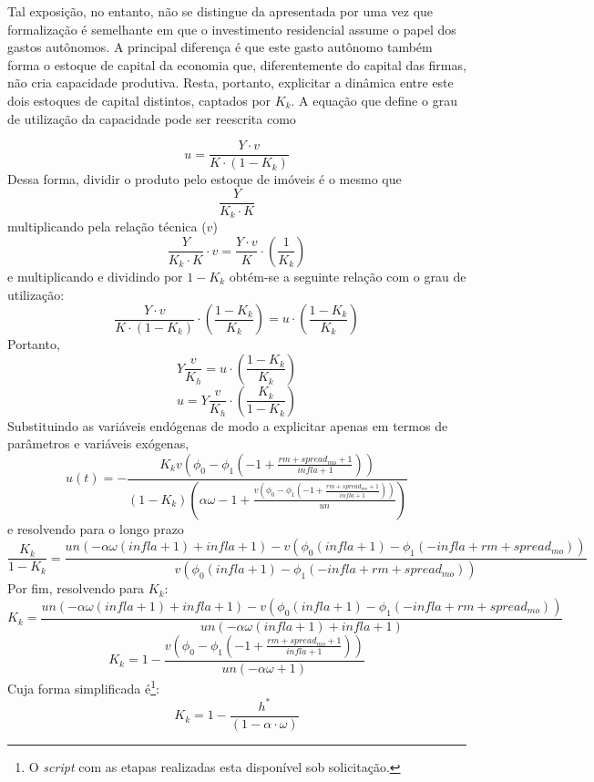 
Tal exposição, no entanto, não se distingue da apresentada por \textcite{freitas_growth_2015} uma vez que formalização é semelhante em que o investimento residencial assume o papel dos gastos autônomos. A principal diferença é que este gasto autônomo também forma o estoque de capital da economia que, diferentemente do capital das firmas, não cria capacidade produtiva. Resta, portanto, explicitar a dinâmica entre este dois estoques de capital distintos, captados por $K_k$. A equação que define o grau de utilização da capacidade pode ser reescrita como

$$
u = \frac{Y\cdot v}{K \cdot (1-K_k)}
$$
Dessa forma, dividir o produto pelo estoque de imóveis é o mesmo que
$$
\frac{Y}{K_k\cdot K}
$$
multiplicando pela relação técnica ($v$)
$$
\frac{Y}{K_k\cdot K}\cdot v = \frac{Y\cdot v}{K}\cdot \left(\frac{1}{K_k}\right)
$$
e multiplicando e dividindo por $1-K_k$ obtém-se a seguinte relação com o grau de utilização:
$$
\frac{Y\cdot v}{K\cdot (1-K_k)}\cdot \left(\frac{1-K_k}{K_k}\right) = u \cdot \left(\frac{1-K_k}{K_k}\right)
$$
Portanto,
$$
Y\frac{v}{K_h} =  u \cdot \left(\frac{1-K_k}{K_k}\right)
$$
$$
u = Y\frac{v}{K_h} \cdot \left(\frac{K_k}{1-K_k}\right)
$$
Substituindo as variáveis endógenas de modo a explicitar apenas em termos de parâmetros e variáveis exógenas,
$$
u{\left(t \right)} = - \frac{K_{k} v \left(\phi_{0} - \phi_{1} \left(-1 + \frac{rm + spread_{mo} + 1}{infla + 1}\right)\right)}{\left(1 - K_{k}\right) \left(\alpha \omega - 1 + \frac{v \left(\phi_{0} - \phi_{1} \left(-1 + \frac{rm + spread_{mo} + 1}{infla + 1}\right)\right)}{un}\right)}
$$
e resolvendo para o longo prazo
$$
\frac{K_{k}}{1 - K_{k}} = \frac{un \left(- \alpha \omega \left(infla + 1\right) + infla + 1\right) - v \left(\phi_{0} \left(infla + 1\right) - \phi_{1} \left(- infla + rm + spread_{mo}\right)\right)}{v \left(\phi_{0} \left(infla + 1\right) - \phi_{1} \left(- infla + rm + spread_{mo}\right)\right)}
$$
Por fim, resolvendo para $K_k$:
$$
K_{k} = \frac{un \left(- \alpha \omega \left(infla + 1\right) + infla + 1\right) - v \left(\phi_{0} \left(infla + 1\right) - \phi_{1} \left(- infla + rm + spread_{mo}\right)\right)}{un \left(- \alpha \omega \left(infla + 1\right) + infla + 1\right)}
$$
\begin{equation}
\label{kAnali}
K_{k} = 1 - \frac{v \left(\phi_{0} - \phi_{1} \left(-1 + \frac{rm + spread_{mo} + 1}{infla + 1}\right)\right)}{un \left(- \alpha \omega + 1\right)}
\end{equation}
Cuja forma simplificada é\footnote{O \textit{script} com as etapas realizadas esta disponível sob solicitação.}:
$$
K_k = 1 - \frac{h^*}{(1 - \alpha\cdot\omega)}
$$

